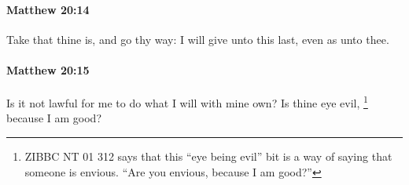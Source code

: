 		\paragraph{Matthew 20:14} %
			\label{MATTHEW-20-14}

			Take that thine is, and go thy way: I will give unto this last, even as unto thee.

			\begin{framed}
			\scriptsize
				\begin{compactdesc}
					\item[SBLG] 
				\end{compactdesc}
			\end{framed}

		\paragraph{Matthew 20:15} %
			\label{MATTHEW-20-15}

			Is it not lawful for me to do what I will with mine own? Is thine eye evil, %
				\footnote{%
					ZIBBC NT 01 312 says that this ``eye being evil'' bit is a way of saying that someone is envious. ``Are you envious, because I am good?''
					}
			because I am good?

